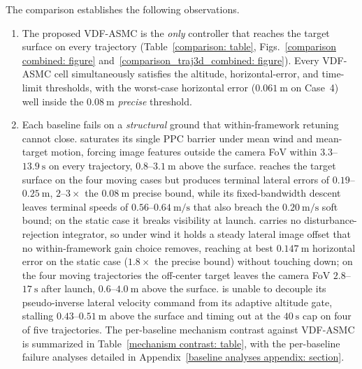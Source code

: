 \documentclass{IEEEtaes}
\begin{document}
The comparison establishes the following observations.
\begin{enumerate}
    \item The proposed VDF-ASMC is the \emph{only} controller that reaches the target surface on every trajectory (Table~\ref{comparison: table}, Figs.~\ref{comparison combined: figure} and~\ref{comparison_traj3d_combined: figure}). Every VDF-ASMC cell simultaneously satisfies the altitude, horizontal-error, and time-limit thresholds, with the worst-case horizontal error ($0.061~\text{m}$ on Case~4) well inside the $0.08~\text{m}$ \emph{precise} threshold.
    \item Each baseline fails on a \emph{structural} ground that within-framework retuning cannot close. \cite{lin2022} saturates its single PPC barrier under mean wind and mean-target motion, forcing image features outside the camera FoV within $3.3$--$13.9~\text{s}$ on every trajectory, $0.8$--$3.1~\text{m}$ above the surface. \cite{zhang2026} reaches the target surface on the four moving cases but produces terminal lateral errors of $0.19$--$0.25~\text{m}$, $2$--$3\times$ the $0.08~\text{m}$ precise bound, while its fixed-bandwidth descent leaves terminal speeds of $0.56$--$0.64~\text{m/s}$ that also breach the $0.20~\text{m/s}$ soft bound; on the static case it breaks visibility at launch. \cite{lin2023} carries no disturbance-rejection integrator, so under wind it holds a steady lateral image offset that no within-framework gain choice removes, reaching at best $0.147~\text{m}$ horizontal error on the static case ($1.8\times$ the precise bound) without touching down; on the four moving trajectories the off-center target leaves the camera FoV $2.8$--$17~\text{s}$ after launch, $0.6$--$4.0~\text{m}$ above the surface. \cite{cho2022} is unable to decouple its pseudo-inverse lateral velocity command from its adaptive altitude gate, stalling $0.43$--$0.51~\text{m}$ above the surface and timing out at the $40~\text{s}$ cap on four of five trajectories. The per-baseline mechanism contrast against VDF-ASMC is summarized in Table~\ref{mechanism contrast: table}, with the per-baseline failure analyses detailed in Appendix~\ref{baseline analyses appendix: section}.


\end{enumerate}
\end{document}
